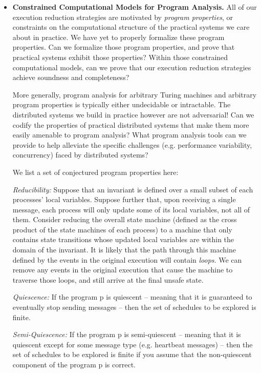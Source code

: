 \begin{itemize}

\item \textbf{Constrained Computational Models for Program Analysis.} All of
our execution reduction strategies are motivated by
\textit{program properties}, or constraints
on the computational structure of the practical systems we care about in
practice. We have yet to properly formalize these program properties. Can we formalize those program properties, and prove that practical systems exhibit those properties? Within those
constrained computational models, can we prove that our execution reduction
strategies achieve
soundness and completeness?

More generally, program analysis for arbitrary Turing machines and arbitrary program properties
is typically either undecidable or intractable. The distributed systems we build
in practice however are not adversarial! Can we codify the properties of practical
distributed systems that make them more easily
amenable to program analysis? What program analysis tools can we provide to help
alleviate the specific challenges (e.g. performance variability, concurrency) faced
by distributed systems?

We list a set of conjectured program properties here:

\textit{Reducibility:} Suppose that an invariant is defined over a small
subset of each processes' local variables. Suppose further that, upon
receiving a single message, each process will only update some
of its local variables, not all of them. Consider reducing the overall state
machine (defined as the cross product of the
state machines of each process) to a machine that only contains state transitions
whose updated local variables are within the domain of the invariant. It is likely
that the path through this machine defined by the events in the original execution
will contain \textit{loops}. We can remove any events in the original
execution that cause the machine to traverse those loops, and still arrive at
the final unsafe state.

\textit{Quiescence:} If the program p is quiescent -- meaning that it is
guaranteed to eventually stop sending messages -- then the set of schedules to
be explored is finite.

\textit{Semi-Quiescence:} If the program p is semi-quiescent -- meaning that it is quiescent except for
some message type (e.g. heartbeat messages) -- then the set of schedules to be
explored is finite if you assume that the non-quiescent component of the
program p is correct.


\end{itemize}
